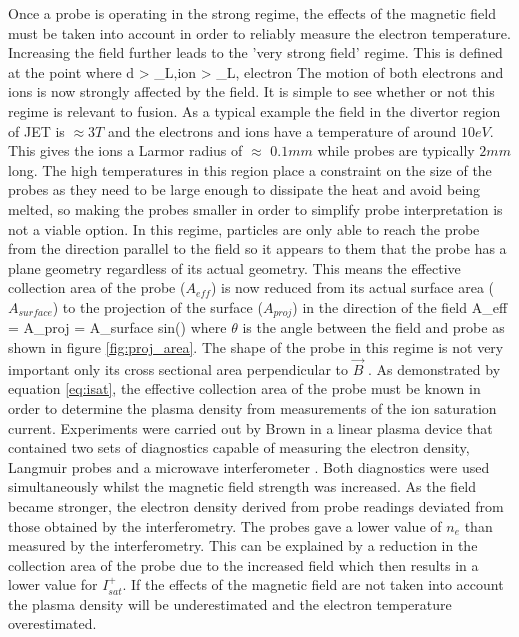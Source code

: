







Once a probe is operating in the strong regime, the effects of the magnetic field must be taken into account in order to reliably measure the electron temperature. Increasing the field further leads to the 'very strong field' regime. This is defined at the point where
\be
d > \rho_{L,ion} >  \rho_{L, electron}
\ee
The motion of both electrons and ions is now strongly affected by the field. It is simple to see whether or not this regime is relevant to fusion. As a typical example the field in the divertor region of JET is  $\approx 3T$ and the electrons and ions have a temperature of around $10eV$. This gives the ions a Larmor radius of $\approx$ $0.1mm$ while probes are typically $2mm$ long. The high temperatures in this region place a constraint on the size of the probes as they need to be large enough to dissipate the heat and avoid being melted, so making the probes smaller in order to simplify probe interpretation is not a viable option. 
In this regime, particles are only able to reach the probe from the direction parallel to the field so it appears to them that the probe has a plane geometry regardless of its actual geometry. This means the effective collection area of the probe ($A_{eff}$) is now reduced from its actual surface area ($A_{surface}$) to the projection of the surface ($A_{proj}$) in the direction of the field 
\be
A_{eff} = A_{proj} = A_{surface} sin(\theta)
\ee
where $\theta$ is the angle between the field and probe as shown in figure \ref{fig:proj_area}.
The shape of the probe in this regime is not very important only its cross sectional area perpendicular to $\vec{B}$ \cite{te-determination}. As demonstrated by equation \ref{eq:isat}, the effective collection area of the probe must be known in order to determine the plasma density from measurements of the ion saturation current. Experiments were carried out by Brown in a linear plasma device that contained two sets of diagnostics capable of measuring the electron density, Langmuir probes and a microwave interferometer \cite{probe-response}. Both diagnostics were used simultaneously whilst the magnetic field strength was increased. As the field became stronger, the electron density derived from probe readings deviated from those obtained by the interferometry. The probes gave a lower value of $n_e$ than measured by the interferometry. This can be explained by a reduction in the collection area of the probe due to the increased field which then results in a lower value for $I_{sat}^+$. If the effects of the magnetic field are not taken into account the plasma density will be underestimated and the electron temperature overestimated.
